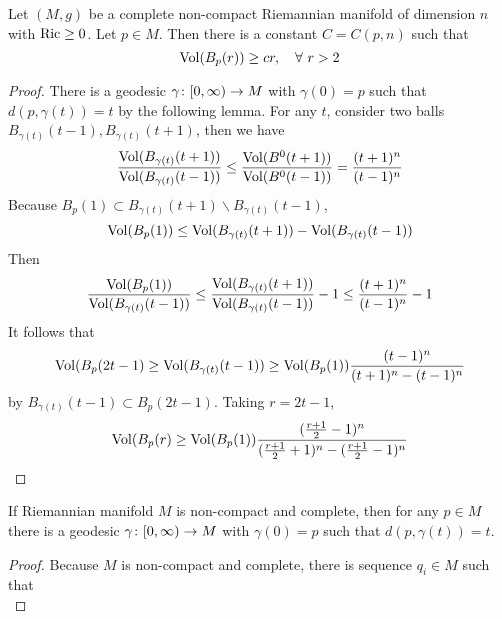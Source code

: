 \begin{enumerate}[label=\arabic{*}]
	\begin{thm}
		Let $(M,g)$ be a complete non-compact Riemannian manifold of dimension $n$ with $\operatorname{Ric} \geq 0$. Let $p\in M$. Then there is a constant $C= C(p,n)$ such that
		\begin{equation*}
			\operatorname{Vol}(B_p(r)) \geq cr,\quad \forall~r>2
		\end{equation*}
	\end{thm}
	\begin{proof}
		There is a geodesic $\gamma \colon [0,\infty) \rightarrow M$ with $\gamma(0)=p$ such that $d(p,\gamma(t)) = t$ by the following lemma. For any $t$, consider two balls $B_{\gamma(t)}(t-1),B_{\gamma(t)}(t+1)$, then we have
		\begin{equation*}
			\frac{\operatorname{Vol}(B_{\gamma(t)}(t+1))}{\operatorname{Vol}(B_{\gamma(t)}(t-1))} \leq \frac{\operatorname{Vol}(B^0(t+1))}{\operatorname{Vol}(B^0(t-1))} = \frac{(t+1)^n}{(t-1)^n}
		\end{equation*}
		Because $B_p(1) \subset B_{\gamma(t)}(t+1) \backslash B_{\gamma(t)}(t-1)$,
		\begin{equation*}
			\operatorname{Vol}(B_p(1)) \leq \operatorname{Vol}(B_{\gamma(t)}(t+1)) - \operatorname{Vol}(B_{\gamma(t)}(t-1))
		\end{equation*}
		Then
		\begin{equation*}
			\frac{\operatorname{Vol}(B_p(1))}{\operatorname{Vol}(B_{\gamma(t)}(t-1))} \leq \frac{\operatorname{Vol}(B_{\gamma(t)}(t+1))}{\operatorname{Vol}(B_{\gamma(t)}(t-1))}  - 1 \leq \frac{(t+1)^n}{(t-1)^n} - 1
		\end{equation*}
		It follows that
		\begin{equation*}
			\operatorname{Vol}(B_{p}(2t-1) \geq \operatorname{Vol}(B_{\gamma(t)}(t-1)) \geq \operatorname{Vol}(B_p(1)) \frac{(t-1)^n}{(t+1)^n-(t-1)^n}
		\end{equation*}
		by $B_{\gamma(t)}(t-1) \subset B_{p}(2t-1)$. Taking $r = 2t-1$,
		\begin{equation*}
			\operatorname{Vol}(B_{p}(r) \geq \operatorname{Vol}(B_p(1)) \frac{(\frac{r+1}{2}-1)^n}{(\frac{r+1}{2}+1)^n-(\frac{r+1}{2}-1)^n} \qedhere
		\end{equation*}
	\end{proof}
	\begin{lem}
		If Riemannian manifold $M$ is non-compact and complete, then for any $p \in M$ there is a geodesic $\gamma \colon [0,\infty) \rightarrow M$ with $\gamma(0)=p$ such that $d(p,\gamma(t)) = t$.
	\end{lem}
	\begin{proof}
		Because $M$ is non-compact and complete, there is sequence $q_i \in M$ such that
		\begin{equation*}

\end{equation*}
\end{proof}
\end{enumerate}
